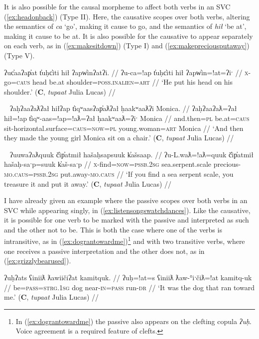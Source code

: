 It is also possible for the causal morpheme to affect both verbs in an SVC (\ref{ex:headonback}) (Type II). Here, the causative scopes over both verbs, altering the semantics of \textit{ca} `go', making it cause to go, and the semantics of \textit{hił} `be at', making it cause to be at. It is also possible for the causative to appear separately on each verb, as in (\ref{ex:makesitdown}) (Type I) and (\ref{ex:makepreciousputaway}) (Type V).

\ex \label{ex:headonback}
\begingl
\glpreamble ʔuc̓aaʔap̓at t̓uḥc̓iti hił ʔapw̓inʔatʔi. //
\gla ʔu-ca=!ap t̓uḥc̓iti hił ʔapw̓in=!at=ʔiˑ //
\glb \textsc{x}-go=\textsc{caus} head be.at shoulder=\textsc{poss.inalien}=\textsc{art} //
\glft `He put his head on his shoulder.' (\textbf{C}, \textit{tupaat} Julia Lucas) //
\endgl
\xe

\ex~ \label{ex:makesitdown}
\begingl
\glpreamble ʔaḥʔaaʔaƛʔał hiłʔap t̓iqʷaasʔap̓aƛʔał ḥaakʷaaƛʔi Monica. //
\gla ʔaḥʔaaʔaƛ=ʔał hił=!ap t̓iqʷ-aas=!ap=!aƛ=ʔał ḥaakʷaaƛ=ʔiˑ Monica //
\glb and.then=\textsc{pl} be.at=\textsc{caus} sit-horizontal.surface=\textsc{caus}=\textsc{now}=\textsc{pl} young.woman=\textsc{art} Monica //
\glft `And then they made the young girl Monica sit on a chair.' (\textbf{C}, \textit{tupaat} Julia Lucas) //
\endgl
\xe

\ex~ \label{ex:makepreciousputaway}
\begingl
\glpreamble ʔuuwaʔaƛquuk č̓ip̓atmił hašaḥsapsuuk k̓ašsaap. //
\gla ʔu-L.waƛ=!aƛ=quuk č̓ip̓atmił hašaḥ-saˑp=suuk k̓aš-saˑp //
\glb \textsc{x}-find=\textsc{now}=\textsc{pssb.2sg} sea.serpent.scale precious-\textsc{mo.caus}=\textsc{pssb.2sg} put.away-\textsc{mo.caus} //
\glft `If you find a sea serpent scale, you treasure it and put it away.' (\textbf{C}, \textit{tupaat} Julia Lucas) //
\endgl
\xe


I have already given an example where the passive scopes over both verbs in an SVC while appearing singly, in (\ref{ex:listensongswatchdances}). Like the causative, it is possible for one verb to be marked with the passive and interpreted as such and the other not to be. This is both the case where one of the verbs is intransitive, as in (\ref{ex:dograntowardme})\footnote{In (\ref{ex:dograntowardme}) the passive also appears on the clefting copula \textit{ʔuḥ}. Voice agreement is a required feature of clefts.} and with two transitive verbs, where one receives a passive interpretation and the other does not, as in (\ref{ex:grizzlybearused}).

\ex \label{ex:dograntowardme}
\begingl
\glpreamble ʔuḥʔats ʕiniiƛ ƛawiičiʔat kamitquk. //
\gla ʔuḥ=!at=s ʕiniiƛ ƛaw-°iˑčiƛ=!at kamitq-uk //
\glb be=\textsc{pass}=\textsc{strg.1sg} dog near-\textsc{in}=\textsc{pass} run-\textsc{dr} //
\glft `It was the dog that ran toward me.' (\textbf{C}, \textit{tupaat} Julia Lucas) //
\endgl
\xe

